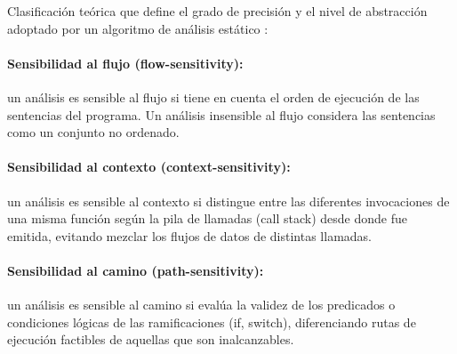 Clasificación teórica que define el grado de precisión y el nivel de abstracción adoptado por un algoritmo de análisis estático \citep{nielson1999}:

\paragraph{Sensibilidad al flujo (flow-sensitivity):} un análisis es sensible al flujo si tiene en cuenta el orden de ejecución de las sentencias del programa. Un análisis insensible al flujo considera las sentencias como un conjunto no ordenado.

\paragraph{Sensibilidad al contexto (context-sensitivity):} un análisis es sensible al contexto si distingue entre las diferentes invocaciones de una misma función según la pila de llamadas (call stack) desde donde fue emitida, evitando mezclar los flujos de datos de distintas llamadas.

\paragraph{Sensibilidad al camino (path-sensitivity):} un análisis es sensible al camino si evalúa la validez de los predicados o condiciones lógicas de las ramificaciones (if, switch), diferenciando rutas de ejecución factibles de aquellas que son inalcanzables.
